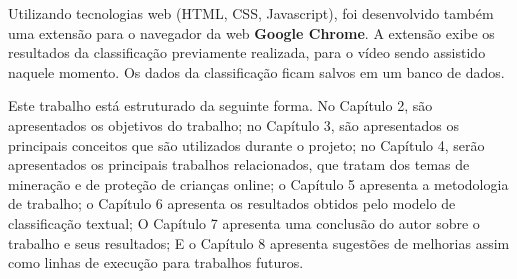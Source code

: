 Utilizando tecnologias web (HTML, CSS, Javascript), foi desenvolvido também uma extensão para o navegador da web \textbf{Google Chrome}. A extensão exibe os resultados da classificação previamente realizada, para o vídeo sendo assistido naquele momento. Os dados da classificação ficam salvos em um banco de dados. 




Este trabalho está estruturado da seguinte forma. No Capítulo 2, são apresentados os objetivos do trabalho; no Capítulo 3, são apresentados os principais conceitos que são utilizados durante o projeto; no Capítulo 4, serão apresentados os principais trabalhos relacionados, que tratam dos temas de mineração e de proteção de crianças online; o Capítulo 5 apresenta a metodologia de trabalho; o Capítulo 6 apresenta os resultados obtidos pelo modelo de classificação textual; O Capítulo 7 apresenta uma conclusão do autor sobre o trabalho e seus resultados; E o Capítulo 8 apresenta sugestões de melhorias assim como linhas de execução para trabalhos futuros.

